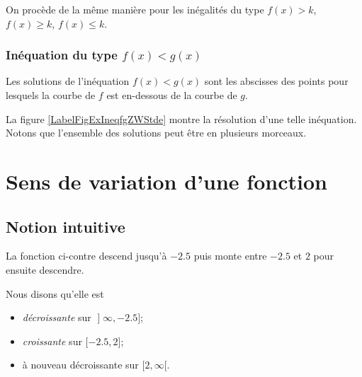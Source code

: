 On procède de la même manière pour les inégalités du type $f(x)>k$, $f(x)\geq k$, $f(x)\leq k$. 

\subsubsection{Inéquation du type $f(x)<g(x)$}

Les solutions de l'inéquation $f(x)<g(x)$ sont les abscisses des points pour lesquels la courbe de \( f\) est en-dessous de la courbe de \( g\).


\newcommand{\CaptionFigExIneqfgZWStde}{En cyan, l'ensemble des solutions de l'inéquation \( f(x)<g(x)\).}


La figure \ref{LabelFigExIneqfgZWStde} montre la résolution d'une telle inéquation. Notons que l'ensemble des solutions peut être en plusieurs morceaux.


\section{Sens de variation d'une fonction}

\subsection{Notion intuitive}

\begin{multicols}{2}

    La fonction ci-contre descend jusqu'à \( -2.5\) puis monte entre \( -2.5\) et \( 2\) pour ensuite descendre.

    Nous disons qu'elle est
    \begin{itemize}
        \item 
            \emph{décroissante} sur \( \mathopen] \infty , -2.5 \mathclose]\);
        \item
            \emph{croissante} sur \( \mathopen[ -2.5 , 2 \mathclose]\);
        \item
            à nouveau décroissante sur \( \mathopen[ 2 , \infty [\).
    \end{itemize}
    
    \columnbreak



\end{multicols}


